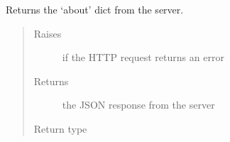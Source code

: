 \documentclass[letterpaper,10pt,english]{sphinxmanual}
\begin{document}
\begin{fulllineitems}
\begin{fulllineitems}
\begin{quote}
\begin{description}
\end{description}\end{quote}

\end{fulllineitems}


\begin{fulllineitems}
\label{\detokenize{autoapi/pine/client/client/index:pine.client.client.EveClient.about}}
\sphinxAtStartPar
Returns the ‘about’ dict from the server.
\begin{quote}\begin{description}
\item[{Raises}] \leavevmode
\sphinxAtStartPar
{\hyperref[\detokenize{autoapi/pine/client/exceptions/index:pine.client.exceptions.PineClientHttpException}]{}} \textendash{} if the HTTP request returns an error

\item[{Returns}] \leavevmode
\sphinxAtStartPar
the JSON response from the server

\item[{Return type}] \leavevmode
\sphinxAtStartPar
{}

\end{description}\end{quote}

\end{fulllineitems}



\end{fulllineitems}
\end{document}
